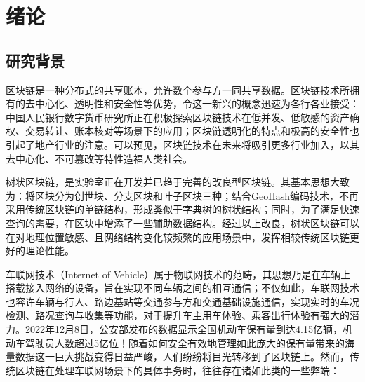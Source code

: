 %
%
%
%
%
%

\chapter{绪论}

\section{研究背景}

区块链是一种分布式的共享账本，允许数个参与方一同共享数据。区块链技术所拥有的去中心化、透明性和安全性等优势，令这一新兴的概念迅速为各行各业接受：中国人民银行数字货币研究所正在积极探索区块链技术在低并发、低敏感的资产确权、交易转让、账本核对等场景下的应用\cite{shuYanSuo}；区块链透明化的特点和极高的安全性也引起了地产行业的注意\cite{usageOfBC}。可以预见，区块链技术在未来将吸引更多行业加入，以其去中心化、不可篡改等特性造福人类社会。

树状区块链，是实验室正在开发并已趋于完善的改良型区块链。其基本思想大致为：将区块分为创世块、分支区块和叶子区块三种；结合GeoHash编码技术，不再采用传统区块链的单链结构，形成类似于字典树的树状结构；同时，为了满足快速查询的需要，在区块中增添了一些辅助数据结构。经过以上改良，树状区块链可以在对地理位置敏感、且网络结构变化较频繁的应用场景中，发挥相较传统区块链更好的理论性能。

车联网技术（Internet of Vehicle）属于物联网技术的范畴，其思想乃是在车辆上搭载接入网络的设备，旨在实现不同车辆之间的相互通信；不仅如此，车联网技术也容许车辆与行人、路边基站等交通参与方和交通基础设施通信，实现实时的车况检测、路况查询与收集等功能，对于提升车主用车体验、乘客出行体验有强大的潜力。2022年12月8日，公安部发布的数据显示全国机动车保有量到达4.15亿辆，机动车驾驶员人数超过5亿位！随着如何安全有效地管理如此庞大的保有量带来的海量数据这一巨大挑战变得日益严峻，人们纷纷将目光转移到了区块链上\cite{bcInIoV}。然而，传统区块链在处理车联网场景下的具体事务时，往往存在诸如此类的一些弊端：

